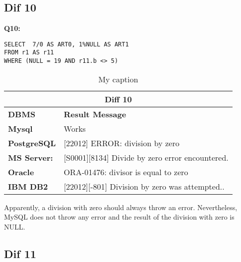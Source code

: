 \subsection{Dif 10}
  
\begin{mdframed}[backgroundcolor=lightgray!20] 
\textbf{Q10:}
\begin{lstlisting}
SELECT  7/0 AS ART0, 1%NULL AS ART1
FROM r1 AS r11
WHERE (NULL = 19 AND r11.b <> 5)   
\end{lstlisting}
\end{mdframed}
 
 
\begin{table}[h]
\centering
\caption{My caption}
\label{my-label}
\begin{tabular}{|p{2cm}|p{12cm}|}
\hline
\multicolumn{2}{|c|}{\textbf{Diff 10}}                                                                                       \\ \hline
\textbf{DBMS}                              & \textbf{Result Message}                                                        \\ \hline
{\color[HTML]{333333} \textbf{Mysql}}      & {\color[HTML]{333333} Works}                                                   \\ \hline
{\color[HTML]{333333} \textbf{PostgreSQL}} & {\color[HTML]{333333} {[}22012{]} ERROR: division by zero}                     \\ \hline
{\color[HTML]{333333} \textbf{MS Server:}} & {\color[HTML]{333333} {[}S0001{]}{[}8134{]} Divide by zero error encountered.} \\ \hline
\textbf{Oracle}                            & ORA-01476: divisor is equal to zero                                            \\ \hline
\textbf{IBM DB2}                           & {[}22012{]}{[}-801{]} Division by zero was attempted..                         \\ \hline
\end{tabular}
\end{table} 

Apparently, a division with zero should always throw an error. Nevertheless, MySQL does not throw any error and the result of the division with zero is NULL. 


\subsection{Dif 11}
  
